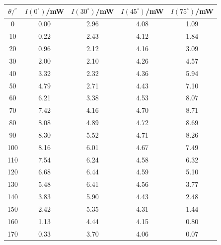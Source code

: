 \begin{tabular}{ccccc}
  \toprule
  $\theta/^{\circ}$ & $I(0^{\circ})$/mW & $I(30^{\circ})$/mW & $I(45^{\circ})$/mW & $I(75^{\circ})$/mW \\
  \midrule
  0 & 0.00 & 2.96 & 4.08 & 1.09 \\
  10 & 0.22 & 2.43 & 4.12 & 1.84 \\
  20 & 0.96 & 2.12 & 4.16 & 3.09 \\
  30 & 2.00 & 2.10 & 4.26 & 4.57 \\
  40 & 3.32 & 2.32 & 4.36 & 5.94 \\
  50 & 4.79 & 2.71 & 4.43 & 7.10 \\
  60 & 6.21 & 3.38 & 4.53 & 8.07 \\
  70 & 7.42 & 4.16 & 4.70 & 8.71 \\
  80 & 8.08 & 4.89 & 4.72 & 8.69 \\
  90 & 8.30 & 5.52 & 4.71 & 8.26 \\
  100 & 8.16 & 6.01 & 4.67 & 7.49 \\
  110 & 7.54 & 6.24 & 4.58 & 6.32 \\
  120 & 6.68 & 6.44 & 4.59 & 5.10 \\
  130 & 5.48 & 6.41 & 4.56 & 3.77 \\
  140 & 3.83 & 5.90 & 4.43 & 2.48 \\
  150 & 2.42 & 5.35 & 4.31 & 1.44 \\
  160 & 1.13 & 4.44 & 4.15 & 0.80 \\
  170 & 0.33 & 3.70 & 4.06 & 0.07 \\
  \bottomrule
\end{tabular}